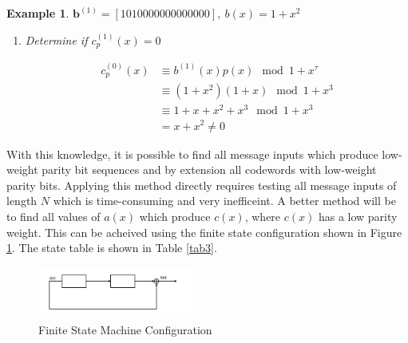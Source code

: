 \documentclass[conference]{IEEEtran}
\newtheorem{example}[theorem]{Example}
\begin{document}
\begin{example}
\label{ex2}
$\textbf{b}^{(1)}=[ 1 0 1 0 0 0 0 0 0 0 0 0 0 0 0 0 ],~ b(x)=1+x^2$

\begin{enumerate}
\item Determine if $c_p^{(1)}(x) =0$

\begin{equation*}
\begin{split}
c_p^{(0)}(x)& \equiv b^{(1)}(x)p(x) \mod{1+x^{\tau}}\\
& \equiv (1+x^2)(1+x)  \mod{1+x^{3}}\\
&\equiv 1+x+x^2+x^3  \mod{1+x^{3}}\\ &=x+x^2 \neq 0
\end{split}
\end{equation*}
\end{enumerate}
\end{example}
 
 With this knowledge, it is possible to find all message inputs which produce low-weight parity bit sequences and by extension all codewords  with low-weight parity bits. Applying this method directly requires testing all message inputs of length $N$ which is time-consuming and very inefficeint. A better method will be to find all values of $a(x)$ which produce $c(x)$, where $c(x)$ has a low parity weight. This can be acheived using the finite state configuration shown in Figure \ref{fig2}. The state table is shown in Table \ref{tab3}. 
 
\begin{figure}[h]
\centering
		\includegraphics[width=0.45\textwidth]{fsm.png}
		\caption{Finite State Machine Configuration}
		\label{fig2}
		\end{figure}
		
\end{document}
